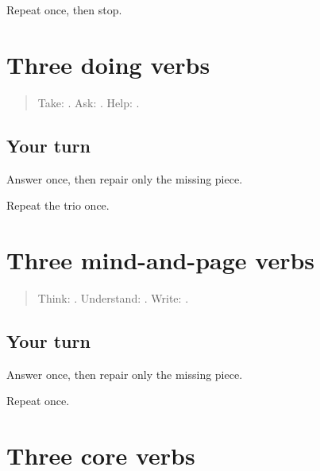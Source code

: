 \begin{tcolorbox}[breakable,colback=teal!4,colframe=teal!35!black,title={Before you move on}]
Repeat once, then stop.
\end{tcolorbox}
\section[ghene / vicharne / madat karne]{Three doing verbs}

\label{lesson:MR-R14-doing}



\begin{quote}
Take: \textbf{}. Ask: \textbf{}. Help: \textbf{ }.
\end{quote}

\subsection*{Your turn}
Answer once, then repair only the missing piece.

\begin{tcolorbox}[breakable,colback=teal!4,colframe=teal!35!black,title={Before you move on}]
Repeat the trio once.
\end{tcolorbox}
\section[vichar karne / samajne / lihine]{Three mind-and-page verbs}

\label{lesson:MR-R14-mind}



\begin{quote}
Think: \textbf{ }. Understand: \textbf{}. Write: \textbf{}.
\end{quote}

\subsection*{Your turn}
Answer once, then repair only the missing piece.

\begin{tcolorbox}[breakable,colback=teal!4,colframe=teal!35!black,title={Before you move on}]
Repeat once.
\end{tcolorbox}
\section[asne / jane / yene]{Three core verbs}

